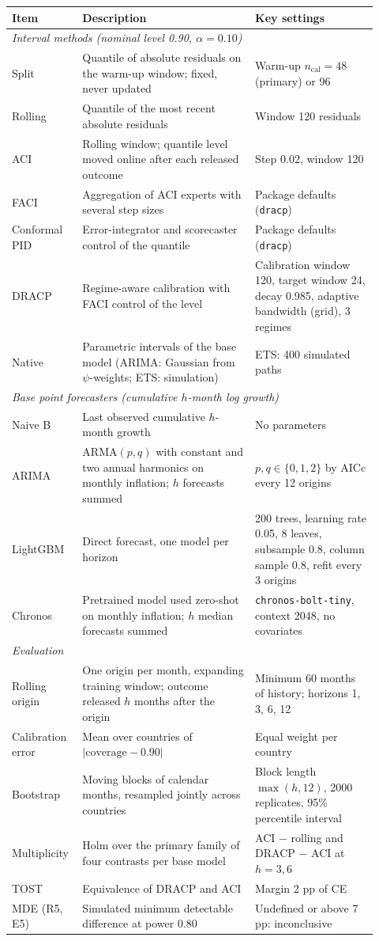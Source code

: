 \begin{tabular}{p{0.15\linewidth}p{0.45\linewidth}p{0.32\linewidth}}
\toprule
Item & Description & Key settings \\
\midrule
\multicolumn{3}{l}{\emph{Interval methods (nominal level 0.90, $\alpha=0.10$)}} \\
Split & Quantile of absolute residuals on the warm-up window; fixed, never updated & Warm-up $n_{\mathrm{cal}}=48$ (primary) or 96 \\
Rolling & Quantile of the most recent absolute residuals & Window 120 residuals \\
ACI & Rolling window; quantile level moved online after each released outcome & Step 0.02, window 120 \\
FACI & Aggregation of ACI experts with several step sizes & Package defaults (\texttt{dracp}) \\
Conformal PID & Error-integrator and scorecaster control of the quantile & Package defaults (\texttt{dracp}) \\
DRACP & Regime-aware calibration with FACI control of the level & Calibration window 120, target window 24, decay 0.985, adaptive bandwidth (grid), 3 regimes \\
Native & Parametric intervals of the base model (ARIMA: Gaussian from $\psi$-weights; ETS: simulation) & ETS: 400 simulated paths \\
\midrule
\multicolumn{3}{l}{\emph{Base point forecasters (cumulative $h$-month log growth)}} \\
Naive B & Last observed cumulative $h$-month growth & No parameters \\
ARIMA & ARMA$(p,q)$ with constant and two annual harmonics on monthly inflation; $h$ forecasts summed & $p,q\in\{0,1,2\}$ by AICc every 12 origins \\
LightGBM & Direct forecast, one model per horizon & 200 trees, learning rate 0.05, 8 leaves, subsample 0.8, column sample 0.8, refit every 3 origins \\
Chronos & Pretrained model used zero-shot on monthly inflation; $h$ median forecasts summed & \texttt{chronos-bolt-tiny}, context 2048, no covariates \\
\midrule
\multicolumn{3}{l}{\emph{Evaluation}} \\
Rolling origin & One origin per month, expanding training window; outcome released $h$ months after the origin & Minimum 60 months of history; horizons 1, 3, 6, 12 \\
Calibration error & Mean over countries of $|\mathrm{coverage}-0.90|$ & Equal weight per country \\
Bootstrap & Moving blocks of calendar months, resampled jointly across countries & Block length $\max(h,12)$, 2000 replicates, 95\% percentile interval \\
Multiplicity & Holm over the primary family of four contrasts per base model & ACI $-$ rolling and DRACP $-$ ACI at $h=3,6$ \\
TOST & Equivalence of DRACP and ACI & Margin 2 pp of CE \\
MDE (R5, E5) & Simulated minimum detectable difference at power 0.80 & Undefined or above 7 pp: inconclusive \\
\bottomrule
\end{tabular}
